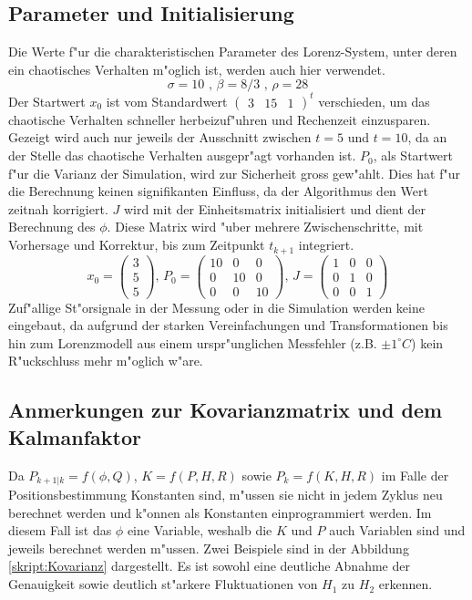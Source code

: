 \begin{refsection}
\subsection{Parameter und Initialisierung}
Die Werte f"ur die charakteristischen Parameter des Lorenz-System, unter deren ein chaotisches Verhalten m"oglich ist, werden auch hier verwendet.\\
\[
\sigma=10 \text{ , } \beta=8/3 \text{ , }\rho=28
\]
Der Startwert $x_{0}$ ist vom Standardwert $\begin{pmatrix}
3 & 15 & 1
\end{pmatrix}^{t}$ verschieden, um das chaotische Verhalten schneller herbeizuf"uhren und Rechenzeit einzusparen. Gezeigt wird auch nur jeweils der Ausschnitt zwischen $t = 5$ und $t=10$, da an der Stelle das chaotische Verhalten ausgepr"agt vorhanden ist. $P_{0}$, als Startwert f"ur die Varianz der Simulation, wird zur Sicherheit gross gew"ahlt. Dies hat f"ur die Berechnung keinen signifikanten Einfluss, da der Algorithmus den Wert zeitnah korrigiert. $J$ wird mit der Einheitsmatrix initialisiert und dient der Berechnung des $\phi$. Diese Matrix wird "uber mehrere Zwischenschritte, mit Vorhersage und Korrektur, bis zum Zeitpunkt $t_{k+1}$ integriert.
\[x_{0}=\begin{pmatrix}
3 \\ 
5 \\ 
5
\end{pmatrix} 
\text{, }
P_{0}=\begin{pmatrix}
10 & 0 & 0 \\ 
0 & 10 & 0 \\ 
0 & 0 & 10
\end{pmatrix} 
\text{, }
J=\begin{pmatrix}
1 & 0 & 0 \\ 
0 & 1 & 0 \\ 
0 & 0 & 1
\end{pmatrix} 
\]
Zuf"allige St"orsignale in der Messung oder in die Simulation werden keine eingebaut, da aufgrund der starken Vereinfachungen und Transformationen bis hin zum Lorenzmodell aus einem urspr"unglichen Messfehler (z.B. $\pm1^\circ C$) kein R"uckschluss mehr m"oglich w"are.

\subsection{Anmerkungen zur Kovarianzmatrix und dem Kalmanfaktor}
Da $P_{k+1|k}=f(\phi, Q)$, $K=f(P,H,R)$ sowie $P_{k}=f(K,H,R)$ im Falle der Positionsbestimmung Konstanten sind, m"ussen sie nicht in jedem Zyklus neu berechnet werden und k"onnen als Konstanten einprogrammiert werden. Im diesem Fall ist das $\phi$ eine Variable, weshalb die $K$ und $P$ auch Variablen sind und jeweils berechnet werden m"ussen. Zwei Beispiele sind in der Abbildung \ref{skript:Kovarianz} dargestellt. Es ist sowohl eine deutliche Abnahme der Genauigkeit sowie deutlich st"arkere Fluktuationen von $H_{1}$ zu $H_{2}$ erkennen.


\end{refsection}
